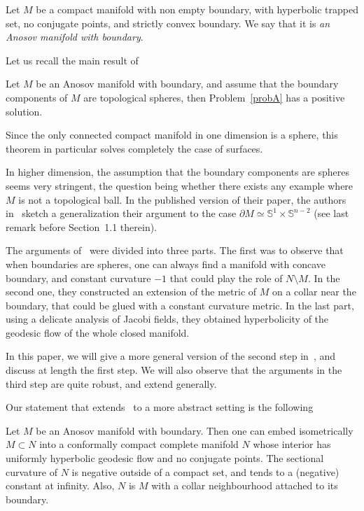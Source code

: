 \documentclass[AHL,Unicode,longabstracts,published]{cedram}
\newcommand{\Ss}{\mathbb{S}}
\theoremstyle{plain}
\begin{document}
\begin{defi}
Let $M$ be a compact manifold with non empty boundary, with hyperbolic trapped set, no conjugate points, and strictly convex boundary. We say that it is \emph{an Anosov manifold with boundary}.
\end{defi}

Let us recall the main result of~\cite{Chen-Erchenko-Gogolev}

\begin{theo}
\label{thm:1}
Let $M$ be an Anosov manifold with boundary, and assume that the boundary components of $M$ are topological spheres, then Problem~\ref{probA} has a positive solution.
\end{theo}

Since the only connected compact manifold in one dimension is a sphere, this theorem in particular solves completely the case of surfaces.

In higher dimension, the assumption that the boundary components are spheres seems very stringent, the question being whether there exists any example where $M$ is not a topological ball. In the published version of their paper, the authors in~\cite{Chen-Erchenko-Gogolev} sketch a generalization their argument to the case $\partial M \simeq \Ss^1 \times \Ss^{n-2}$ (see last remark before Section~1.1 therein).

The arguments of~\cite{Chen-Erchenko-Gogolev} were divided into three parts. The first was to observe that when boundaries are spheres, one can always find a manifold with concave boundary, and constant curvature $-1$ that could play the role of $N\setminus M$. In the second one, they constructed an extension of the metric of $M$ on a collar near the boundary, that could be glued with a constant curvature metric. In the last part, using a delicate analysis of Jacobi fields, they obtained hyperbolicity of the geodesic flow of the whole closed manifold.

In this paper, we will give a more general version of the second step in~\cite{Chen-Erchenko-Gogolev}, and discuss at length the first step. We will also observe that the arguments in the third step are quite robust, and extend generally.

Our statement that extends~\cite[Step~2]{Chen-Erchenko-Gogolev} to a more abstract setting is the following

\begin{theo}\label{thm:conformally-compact}
Let $M$ be an Anosov manifold with boundary. Then one can embed isometrically $M\subset N$ into a conformally compact complete manifold $N$ whose interior has uniformly hyperbolic geodesic flow and no conjugate points. The sectional curvature of $N$ is negative outside of a compact set, and tends to a (negative) constant at infinity. Also, $N$ is $M$ with a collar neighbourhood attached to its boundary.
\end{theo}
\end{document}
